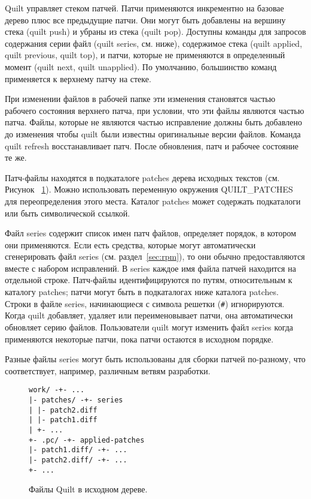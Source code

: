 \documentclass{article}
\newcommand{\quilt}[1]{\textsf{quilt #1}}
\begin{document}
Quilt управляет стеком патчей. Патчи применяются инкрементно на базовае дерево плюс все предыдущие патчи. Они могут быть добавлены на вершину стека (\quilt{push}) и убраны из стека (\quilt{pop}). Доступны команды для запросов содержания серии файл (\quilt{series}, см. ниже), содержимое стека (\quilt{applied}, \quilt{previous}, \quilt{top}), и патчи, которые не применяются в определенный момент (\quilt{next}, \quilt{unapplied}). По умолчанию, большинство команд применяется к верхнему патчу на стеке.

При изменении файлов в рабочей папке эти изменения становятся частью рабочего состояния верхнего патча, при условии, что эти файлы являются частью патча. Файлы, которые не являются частью исправление должны быть добавлено до изменения чтобы quilt были известны оригинальные версии файлов. Команда \quilt{refresh} восстанавливает патч. После обновления, патч и рабочее состояние те же.

Патч-файлы находятся в подкаталоге \textsf{patches} дерева исходных текстов (см. Рисунок ~\ref{fig:dir-layout}). Можно использовать переменную окружения \textsf{QUILT\_PATCHES} для переопределения этого места. Каталог \textsf{patches} может содержать подкаталоги или быть символической ссылкой.

Файл \textsf{series} содержит список имен патч файлов, определяет порядок, в котором они применяются. Если есть средства, которые могут автоматически сгенерировать файл \textsf{series} (см. раздел~\ref{sec:rpm}), то они обычно предоставляются вместе с набором исправлений. В \textsf{series} каждое имя файла патчей находится на отдельной строке. Патч-файлы идентифицируются по путям, относительным к каталогу \textsf{patches}; патчи могут быть в подкаталогах ниже каталога \textsf{patches}. Строки в файле \textsf{series}, начинающиеся с символа решетки (\texttt{\#}) игнорируются. Когда quilt добавляет, удаляет или переименовывает патчи, она автоматически обновляет серию файлов. Пользователи quilt могут изменить файл \textsf{series} когда применяются некоторые патчи, пока патчи остаются в исходном порядке.

Разные файлы \textsf{series} могут быть использованы для сборки патчей по-разному, что соответствует, например, различным ветвям разработки.

\begin{figure}
\begin{center}
\begin{minipage}{6cm}
\begin{small}
\begin{Verbatim}
work/ -+- ...
|- patches/ -+- series
| |- patch2.diff
| |- patch1.diff
| +- ...
+- .pc/ -+- applied-patches
|- patch1.diff/ -+- ...
|- patch2.diff/ -+- ...
+- ...
\end{Verbatim}
\end{small}
\end{minipage}
\caption{Файлы Quilt в исходном дереве.}
\label{fig:dir-layout}
\end{center}
\end{figure}
\end{document}
